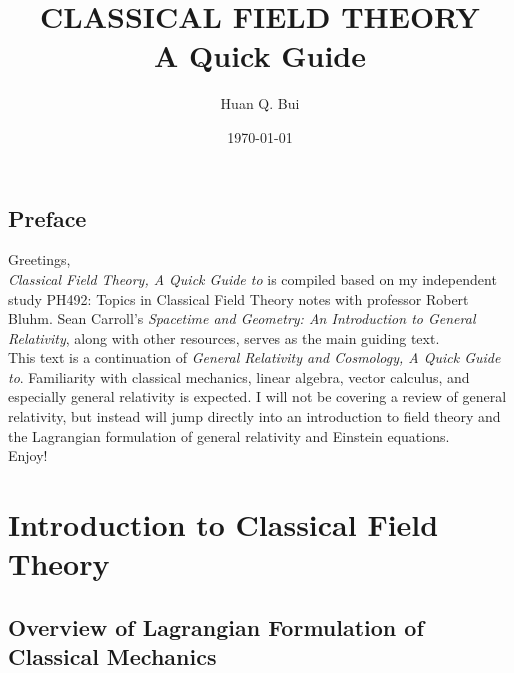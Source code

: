 \documentclass[a4paper,11pt]{article}
\numberwithin{equation}{section}
\theoremstyle{definition}
\begin{document}
\begin{titlepage}\centering
 \clearpage
 \title{\textsc{\bf{CLASSICAL FIELD THEORY}}\\\smallskip A Quick Guide\\}
 \author{\bigskip Huan Q. Bui}
 \date{\today}
 \maketitle
 \thispagestyle{empty}
\end{titlepage}

\newpage

\subsection*{Preface}

Greetings,\\

\textit{Classical Field Theory, A Quick Guide to} is compiled based on my independent study PH492: Topics in Classical Field Theory notes with professor Robert Bluhm. Sean Carroll's \textit{Spacetime and Geometry: An Introduction to General Relativity}, along with other resources, serves as the main guiding text. \\

This text is a continuation of \textit{General Relativity and Cosmology, A Quick Guide to}. Familiarity with classical mechanics, linear algebra, vector calculus, and especially general relativity is expected. I will not be covering a review of general relativity, but instead will jump directly into an introduction to field theory and the Lagrangian formulation of general relativity and Einstein equations.\\ 

Enjoy!


\newpage

\tableofcontents

\newpage

\section{Introduction to Classical Field Theory}
\subsection{Overview of Lagrangian Formulation of Classical Mechanics}
\end{document}
